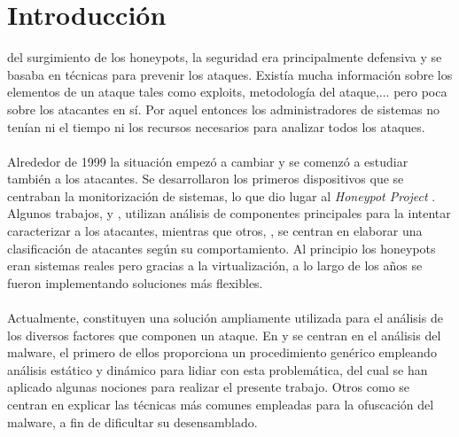 \documentclass[journal]{IEEEtran}
\begin{document}
%
\IEEEpeerreviewmaketitle



\section{Introducción}
 del surgimiento de los honeypots, la seguridad era principalmente defensiva y se basaba en técnicas para prevenir los ataques. Existía mucha información sobre los elementos de un ataque tales como exploits, metodología del ataque,... pero poca sobre los atacantes en sí. Por aquel entonces los administradores de sistemas no tenían ni el tiempo ni los recursos necesarios para analizar todos los ataques.
\\\\
Alrededor de 1999 la situación empezó a cambiar y se comenzó a estudiar también a los atacantes. Se desarrollaron los primeros dispositivos que se centraban la monitorización de sistemas, lo que dio lugar al {\it Honeypot Project} \cite{honeynet.project}. Algunos trabajos, \cite{almotairi2008characterization} y \cite{almotairi2009technique}, utilizan análisis de componentes principales para la intentar caracterizar a los atacantes, mientras que otros, \cite{salles2011characterizing}, se centran en elaborar una clasificación de atacantes según su comportamiento. Al principio los honeypots eran sistemas reales pero gracias a la virtualización, a lo largo de los años se fueron implementando soluciones más flexibles.
\\\\
Actualmente, constituyen una solución ampliamente utilizada para el análisis de los diversos factores que componen un ataque. En \cite{kendall2007practical} y \cite{quist2009visualizing} se centran en el análisis del malware, el primero de ellos proporciona un procedimiento genérico empleando análisis estático y dinámico para lidiar con esta problemática, del cual se han aplicado algunas nociones para realizar el presente trabajo. Otros como \cite{ofuscation} se centran en explicar las técnicas más comunes empleadas para la ofuscación del malware, a fin de dificultar su desensamblado.
\end{document}

